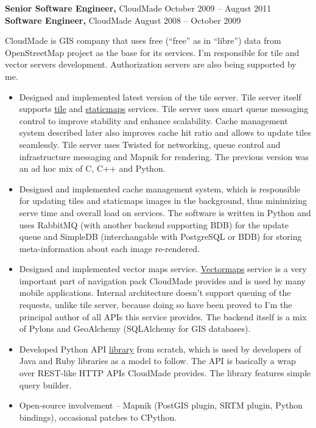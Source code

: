 \documentclass[margin]{res}
\begin{document}
\begin{resume}
{\bf Senior Software Engineer,} CloudMade \hfill October 2009 -- August 2011\\
{\bf Software Engineer,} CloudMade \hfill August 2008 -- October 2009

CloudMade is GIS company that uses free
(``free'' as in ``libre'') data from OpenStreetMap project as
the base for its services. I'm responsible for tile and
vector servers development. Authorization servers are also
being supported by me.\\

\begin{itemize} \itemsep -1pt
\item Designed and implemented latest version of the tile
  server. Tile server itself supports
  \href{http://developers.cloudmade.com/projects/show/tiles}{tile} and
  \href{http://developers.cloudmade.com/projects/show/static-maps}{staticmaps}
  services.
  Tile server uses smart queue messaging control
  to improve stability and enhance scalability. Cache management system
  described later also improves cache hit ratio and
  allows to update tiles seamlessly. Tile server uses
  Twisted for networking, queue control and infrastructure messaging
  and Mapnik for rendering.
  The previous version was an ad hoc mix of C, C++ and Python.
\item Designed and implemented cache management system, which is
  responsible for updating tiles and staticmaps images in the
  background, thus minimizing serve time and overall load on
  services. The software is written in Python and uses RabbitMQ
  (with another backend supporting BDB) for the update queue and
  SimpleDB (interchangable with PostgreSQL or BDB) for storing
  meta-information about each image re-rendered.
\item Designed and implemented vector maps service.
  \href{http://developers.cloudmade.com/projects/show/vector-stream-server}{Vectormaps}
  service is a very important part of
  navigation pack CloudMade provides and is used by many
  mobile applications.
  Internal architecture doesn't support queuing of the requests, unlike
  tile server, because doing so have been proved to
  I'm the principal author of all APIs this service
  provides. The backend itself is a mix of Pylons
  and GeoAlchemy (SQLAlchemy for GIS databases).
\item Developed Python API
  \href{http://developers.cloudmade.com/projects/show/python-lib}{library}
  from scratch,
  which is  used by developers of Java and Ruby
  libraries as a model to follow. The API is basically a wrap over
  REST-like HTTP APIs CloudMade provides. The library features simple
  query builder.
\item Open-source involvement -- Mapnik
  (PostGIS plugin, SRTM plugin,
  Python bindings), occasional patches to CPython.
\end{itemize}


\end{resume}
\end{document}
